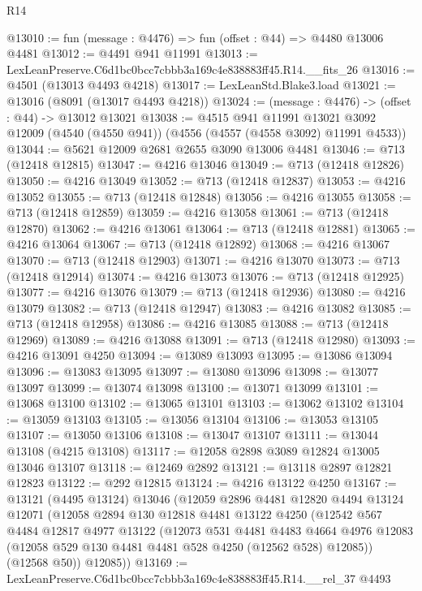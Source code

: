 \begin{lexlean}{R14}
\begin{coremodule}
@13010 := fun (message : @4476) => fun (offset : @44) => @4480 @13006 @4481
@13012 := @4491 @941 @11991
@13013 := LexLeanPreserve.C6d1bc0bcc7cbbb3a169c4e838883ff45.R14.__fits_26
@13016 := @4501 (@13013 @4493 @4218)
@13017 := LexLeanStd.Blake3.load
@13021 := @13016 (@8091 (@13017 @4493 @4218))
@13024 := (message : @4476) -> (offset : @44) -> @13012 @13021
@13038 := @4515
    @941
    @11991
    @13021
    @3092
    @12009
    (@4540 (@4550 @941))
    (@4556 (@4557 (@4558 @3092) @11991 @4533))
@13044 := @5621 @12009 @2681 @2655 @3090 @13006 @4481
@13046 := @713 (@12418 @12815)
@13047 := @4216 @13046
@13049 := @713 (@12418 @12826)
@13050 := @4216 @13049
@13052 := @713 (@12418 @12837)
@13053 := @4216 @13052
@13055 := @713 (@12418 @12848)
@13056 := @4216 @13055
@13058 := @713 (@12418 @12859)
@13059 := @4216 @13058
@13061 := @713 (@12418 @12870)
@13062 := @4216 @13061
@13064 := @713 (@12418 @12881)
@13065 := @4216 @13064
@13067 := @713 (@12418 @12892)
@13068 := @4216 @13067
@13070 := @713 (@12418 @12903)
@13071 := @4216 @13070
@13073 := @713 (@12418 @12914)
@13074 := @4216 @13073
@13076 := @713 (@12418 @12925)
@13077 := @4216 @13076
@13079 := @713 (@12418 @12936)
@13080 := @4216 @13079
@13082 := @713 (@12418 @12947)
@13083 := @4216 @13082
@13085 := @713 (@12418 @12958)
@13086 := @4216 @13085
@13088 := @713 (@12418 @12969)
@13089 := @4216 @13088
@13091 := @713 (@12418 @12980)
@13093 := @4216 @13091 @4250
@13094 := @13089 @13093
@13095 := @13086 @13094
@13096 := @13083 @13095
@13097 := @13080 @13096
@13098 := @13077 @13097
@13099 := @13074 @13098
@13100 := @13071 @13099
@13101 := @13068 @13100
@13102 := @13065 @13101
@13103 := @13062 @13102
@13104 := @13059 @13103
@13105 := @13056 @13104
@13106 := @13053 @13105
@13107 := @13050 @13106
@13108 := @13047 @13107
@13111 := @13044 @13108 (@4215 @13108)
@13117 := @12058 @2898 @3089 @12824 @13005 @13046 @13107
@13118 := @12469 @2892
@13121 := @13118 @2897 @12821 @12823
@13122 := @292 @12815
@13124 := @4216 @13122 @4250
@13167 := @13121
    (@4495 @13124)
    @13046
    (@12059
      @2896
      @4481
      @12820
      @4494
      @13124
      @12071
      (@12058
        @2894
        @130
        @12818
        @4481
        @13122
        @4250
        (@12542
          @567
          @4484
          @12817
          @4977
          @13122
          (@12073
            @531
            @4481
            @4483
            @4664
            @4976
            @12083
            (@12058 @529 @130 @4481 @4481 @528 @4250 (@12562 @528) @12085))
          (@12568 @50))
        @12085))
@13169 := LexLeanPreserve.C6d1bc0bcc7cbbb3a169c4e838883ff45.R14.__rel_37 @4493

\end{coremodule}
\end{lexlean}

